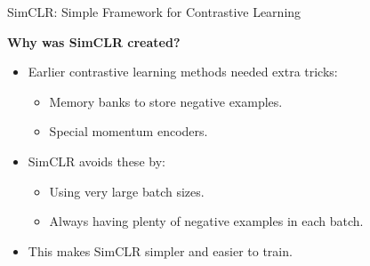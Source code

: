 \begin{frame}[allowframebreaks]{SimCLR: Simple Framework for Contrastive Learning}
\framebreak

\textbf{Why was SimCLR created?}
\begin{itemize}
    \item Earlier contrastive learning methods needed extra tricks:
    \begin{itemize}
        \item Memory banks to store negative examples.
        \item Special momentum encoders.
    \end{itemize}
    \item SimCLR avoids these by:
    \begin{itemize}
        \item Using very large batch sizes.
        \item Always having plenty of negative examples in each batch.
    \end{itemize}
    \item This makes SimCLR simpler and easier to train.
\end{itemize}

\framebreak


\end{frame}

